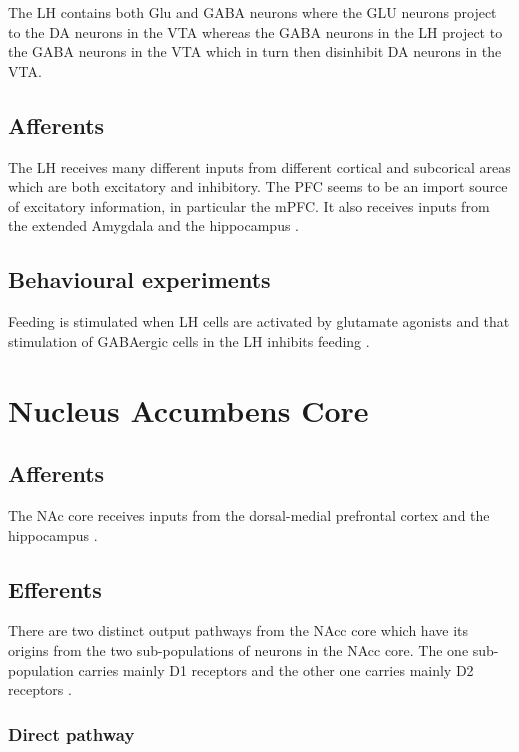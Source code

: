 \documentclass[12pt,a4paper]{article}
\let\oldsection\section
\renewcommand\section{\clearpage\oldsection}
\begin{document}
The LH contains both Glu and GABA neurons where the GLU neurons project to the DA neurons in the VTA whereas the GABA neurons in the LH project to the GABA neurons in the VTA which in turn then disinhibit DA neurons in the VTA. 


\subsection{Afferents}

The LH receives many different inputs from different cortical and subcorical areas which are both excitatory and inhibitory. The PFC seems to be an import source of excitatory information, in particular the mPFC. It also receives inputs from the extended Amygdala and the hippocampus \citep{Stuber2016}.

\subsection{Behavioural experiments}

Feeding is stimulated when LH cells are activated by glutamate
agonists \citep{stanley93} and that stimulation of GABAergic cells in the LH inhibits feeding \citep{Stanley2011}.





\section{Nucleus Accumbens Core}

\subsection{Afferents}

The NAc core receives inputs from the dorsal-medial prefrontal cortex and the hippocampus \citep{brog93}.

\subsection{Efferents}

There are two distinct output pathways from the NAcc core which have its origins from the two sub-populations of neurons in the NAcc core. The one sub-population carries mainly D1 receptors and the other one carries mainly D2 receptors \citep{kelley04} \citep{Humphries2010}. 

\subsubsection{Direct pathway}
\end{document}
